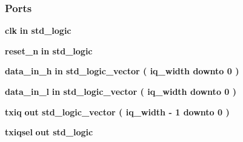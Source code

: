 \subsubsection*{Ports}
 \begin{DoxyCompactItemize}
\item 
{\bf clk}  {\bfseries {\bfseries \textcolor{keywordflow}{in}\textcolor{vhdlchar}{ }}} {\bfseries \textcolor{comment}{std\+\_\+logic}\textcolor{vhdlchar}{ }} 
\item 
{\bf reset\+\_\+n}  {\bfseries {\bfseries \textcolor{keywordflow}{in}\textcolor{vhdlchar}{ }}} {\bfseries \textcolor{comment}{std\+\_\+logic}\textcolor{vhdlchar}{ }} 
\item 
{\bf data\+\_\+in\+\_\+h}  {\bfseries {\bfseries \textcolor{keywordflow}{in}\textcolor{vhdlchar}{ }}} {\bfseries \textcolor{comment}{std\+\_\+logic\+\_\+vector}\textcolor{vhdlchar}{ }\textcolor{vhdlchar}{(}\textcolor{vhdlchar}{ }\textcolor{vhdlchar}{ }\textcolor{vhdlchar}{ }\textcolor{vhdlchar}{ }{\bfseries {\bf iq\+\_\+width}} \textcolor{vhdlchar}{ }\textcolor{keywordflow}{downto}\textcolor{vhdlchar}{ }\textcolor{vhdlchar}{ } \textcolor{vhdldigit}{0} \textcolor{vhdlchar}{ }\textcolor{vhdlchar}{)}\textcolor{vhdlchar}{ }} 
\item 
{\bf data\+\_\+in\+\_\+l}  {\bfseries {\bfseries \textcolor{keywordflow}{in}\textcolor{vhdlchar}{ }}} {\bfseries \textcolor{comment}{std\+\_\+logic\+\_\+vector}\textcolor{vhdlchar}{ }\textcolor{vhdlchar}{(}\textcolor{vhdlchar}{ }\textcolor{vhdlchar}{ }\textcolor{vhdlchar}{ }\textcolor{vhdlchar}{ }{\bfseries {\bf iq\+\_\+width}} \textcolor{vhdlchar}{ }\textcolor{keywordflow}{downto}\textcolor{vhdlchar}{ }\textcolor{vhdlchar}{ } \textcolor{vhdldigit}{0} \textcolor{vhdlchar}{ }\textcolor{vhdlchar}{)}\textcolor{vhdlchar}{ }} 
\item 
{\bf txiq}  {\bfseries {\bfseries \textcolor{keywordflow}{out}\textcolor{vhdlchar}{ }}} {\bfseries \textcolor{comment}{std\+\_\+logic\+\_\+vector}\textcolor{vhdlchar}{ }\textcolor{vhdlchar}{(}\textcolor{vhdlchar}{ }\textcolor{vhdlchar}{ }\textcolor{vhdlchar}{ }\textcolor{vhdlchar}{ }{\bfseries {\bf iq\+\_\+width}} \textcolor{vhdlchar}{-\/}\textcolor{vhdlchar}{ } \textcolor{vhdldigit}{1} \textcolor{vhdlchar}{ }\textcolor{keywordflow}{downto}\textcolor{vhdlchar}{ }\textcolor{vhdlchar}{ } \textcolor{vhdldigit}{0} \textcolor{vhdlchar}{ }\textcolor{vhdlchar}{)}\textcolor{vhdlchar}{ }} 
\item 
{\bf txiqsel}  {\bfseries {\bfseries \textcolor{keywordflow}{out}\textcolor{vhdlchar}{ }}} {\bfseries \textcolor{comment}{std\+\_\+logic}\textcolor{vhdlchar}{ }} 
\end{DoxyCompactItemize}


